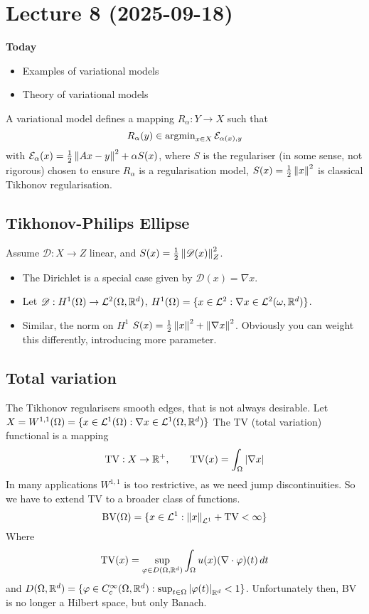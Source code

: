 \documentclass[12pt]{article}
\begin{document}
\newpage
\section{Lecture 8 (2025-09-18)}

\textbf{Today}
\begin{itemize}
    \item Examples of variational models
    \item Theory of variational models
\end{itemize}
A variational model defines a mapping $R_\alpha:Y\to X$ such that 
\begin{equation*}
    R_\alpha(y) \in \operatorname{argmin}_{x\in X} \mathcal{E}_{\alpha(x),y}
\end{equation*}
with $\mathcal{E}_\alpha(x) = \frac{1}{2}\left\lVert Ax-y\right\rVert^2 +\alpha S(x)$, where $S$ is the regulariser (in some sense, not rigorous) chosen to ensure $R_\alpha$ is a regularisation model, $S(x)=\frac{1}{2}\left\lVert x\right\rVert^2$ is classical Tikhonov regularisation.

\subsection{Tikhonov-Philips Ellipse}
Assume $\mathscr{D}:X\to Z$ linear, and $S(x) = \frac{1}{2}\left\lVert\mathscr{D}(x)\right\rVert_Z^2$. 
\begin{itemize}
    \item The Dirichlet is a special case given by $\mathscr{D}(x) = \nabla x$.
    \item Let $\mathscr{D}:H^1(\Omega) \to \mathcal{L}^2(\Omega, \mathbb{R}^d)$, $H^1(\Omega) = \{x\in \mathcal{L}^2:\nabla x\in \mathcal{L}^2(\omega,\mathbb{R}^d)\}$.
    \item Similar, the norm on $H^1$ $S(x) = \frac{1}{2} \left\lVert x\right\rVert^2+\left\lVert\nabla x\right\rVert^2$. Obviously you can weight this differently, introducing more parameter.
\end{itemize}

\subsection{Total variation}
The Tikhonov regularisers smooth edges, that is not always desirable. Let $X=W^{1,1}(\Omega) = \{x\in\mathcal{L}^1(\Omega): \nabla x\in\mathcal{L}^1(\Omega,\mathbb{R}^d)\}$ The TV (total variation) functional is a mapping
\begin{equation*}
    \operatorname{TV}:X\to\mathbb{R}^+, \qquad \operatorname{TV}(x) = \int_\Omega \left|\nabla x\right|
\end{equation*} 
In many applications $W^{1,1}$ is too restrictive, as we need jump discontinuities. So we have to extend TV to a broader class of functions.
\begin{equation*}
    \text{BV}(\Omega)= \{x\in \mathcal{L}^1:\left\lVert x\right\rVert_{\mathcal{L}^1}+\operatorname{TV} <\infty\}
\end{equation*}
Where 
\begin{equation*}
    \operatorname{TV}(x) = \sup_{\varphi\in D(\Omega,\mathbb{R}^d)}\int_\Omega u(x) (\nabla\cdot \varphi)(t)\,dt
\end{equation*}
and $D(\Omega,\mathbb{R}^d) = \{\varphi\in C_c^\infty(\Omega, \mathbb{R}^d) : \sup_{t\in\Omega} \left|\varphi(t)\right|_{\mathbb{R}^d}<1\}$. Unfortunately then, BV is no longer a Hilbert space, but only Banach. 
\end{document}
